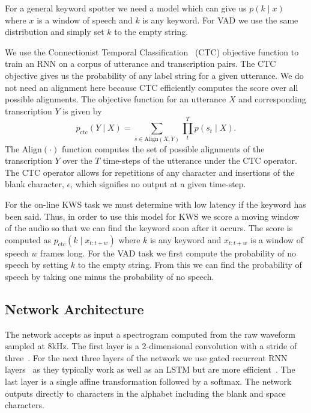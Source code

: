 For a general keyword spotter we need a model which can give us $p(k \mid x)$
where $x$ is a window of speech and $k$ is any keyword. For VAD we use the same
distribution and simply set $k$ to the empty string.

We use the Connectionist Temporal Classification~\cite{graves2006} (CTC)
objective function to train an RNN on a corpus of utterance and transcription
pairs. The CTC objective gives us the probability of any label string for a
given utterance. We do not need an alignment here because CTC efficiently
computes the score over all possible alignments. The objective function for an
utterance $X$ and corresponding transcription $Y$ is given by
\begin{equation}
p_{\mathrm{ctc}}(Y \mid X) = \sum_{s \in \mathrm{Align}(X, Y)} \prod_t^T p(s_t \mid X).
\end{equation}
The $\mathrm{Align}(\cdot)$ function computes the set of possible alignments of
the transcription $Y$ over the $T$ time-steps of the utterance under the CTC
operator. The CTC operator allows for repetitions of any character and
insertions of the blank character, $\epsilon$, which signifies no output at a
given time-step.

For the on-line KWS task we must determine with low latency if the keyword has
been said. Thus, in order to use this model for KWS we score a moving window of
the audio so that we can find the keyword soon after it occurs. The score is
computed as $p_{\mathrm{ctc}}(k \mid x_{t:t+w})$ where $k$ is any keyword and
$x_{t:t+w}$ is a window of speech $w$ frames long. For the VAD task we first
compute the probability of no speech by setting $k$ to the empty string.  From
this we can find the probability of speech by taking one minus the probability
of no speech.

\subsection{Network Architecture}
\label{sec:kws:architecture}

The network accepts as input a spectrogram computed from the raw waveform
sampled at 8kHz. The first layer is a 2-dimensional convolution with a stride
of three~\cite{amodei2016deep}. For the next three layers of the network we use
gated recurrent RNN layers~\cite{cho2014} as they typically work as well as an
LSTM but are more efficient~\cite{chung2014}. The last layer is a single affine
transformation followed by a softmax. The network outputs directly to
characters in the alphabet including the blank and space characters.

